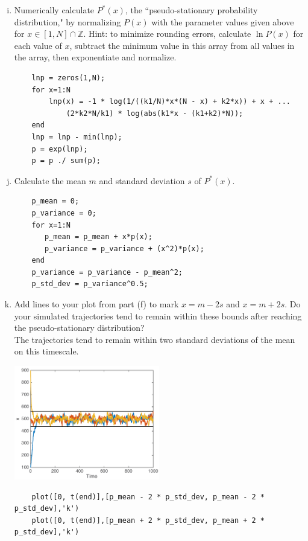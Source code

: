 \documentclass{article}
\begin{document}
\begin{enumerate}[a)]
\setcounter{enumi}{8}
\item Numerically calculate $P^*(x)$, the ``pseudo-stationary probability distribution," by normalizing $P(x)$ with the parameter values given above for $x \in [1, N] \cap \mathbb{Z}$.  Hint: to minimize rounding errors, calculate $\ln P(x)$ for each value of $x$, subtract the minimum value in this array from all values in the array, then exponentiate and normalize.\\
\begin{lstlisting}
    lnp = zeros(1,N);
    for x=1:N
        lnp(x) = -1 * log(1/((k1/N)*x*(N - x) + k2*x)) + x + ...
            (2*k2*N/k1) * log(abs(k1*x - (k1+k2)*N));
    end
    lnp = lnp - min(lnp);
    p = exp(lnp);
    p = p ./ sum(p);
\end{lstlisting}
\item Calculate the mean $m$ and standard deviation $s$ of $P^*(x)$.
\begin{lstlisting}
    p_mean = 0;
    p_variance = 0;
    for x=1:N
       p_mean = p_mean + x*p(x);
       p_variance = p_variance + (x^2)*p(x);
    end
    p_variance = p_variance - p_mean^2;
    p_std_dev = p_variance^0.5;
\end{lstlisting}
\item Add lines to your plot from part (f) to mark $x=m-2s$ and $x=m+2s$. Do your simulated trajectories tend to remain within these bounds after reaching the pseudo-stationary distribution?\\
{\color{red} The trajectories tend to remain within two standard deviations of the mean on this timescale. }
\begin{center}
\includegraphics[width=0.5\textwidth]{problem2j.pdf}
\end{center}
\begin{lstlisting}
    plot([0, t(end)],[p_mean - 2 * p_std_dev, p_mean - 2 * p_std_dev],'k')
    plot([0, t(end)],[p_mean + 2 * p_std_dev, p_mean + 2 * p_std_dev],'k')
\end{lstlisting}

\end{enumerate}
\end{document}
